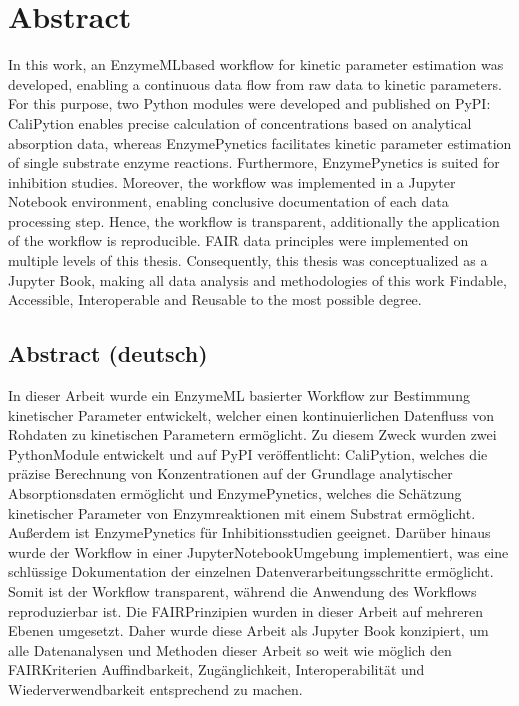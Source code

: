 \documentclass[letterpaper,12pt,english]{jupyterBook}
\begin{document}
\chapter{Abstract}
\label{\detokenize{abstract:abstract}}\label{\detokenize{abstract::doc}}
\sphinxAtStartPar
In this work, an EnzymeML\sphinxhyphen{}based workflow for kinetic parameter estimation was developed, enabling a continuous data flow from raw data to kinetic parameters.
For this purpose, two Python modules were developed and published on PyPI: CaliPytion enables precise calculation of concentrations based on analytical absorption data, whereas EnzymePynetics facilitates kinetic parameter estimation of single substrate enzyme reactions. Furthermore, EnzymePynetics is suited for inhibition studies.
Moreover, the workflow was implemented in a Jupyter Notebook environment, enabling conclusive documentation of each data processing step. Hence, the workflow is transparent, additionally the application of the workflow is reproducible. FAIR data principles were implemented on multiple levels of this thesis. Consequently, this thesis was conceptualized as a Jupyter Book, making all data analysis and methodologies of this work Findable, Accessible, Interoperable and Reusable to the most possible degree.


\section{Abstract (deutsch)}
\label{\detokenize{abstract:abstract-deutsch}}
\sphinxAtStartPar
In dieser Arbeit wurde ein EnzymeML basierter Workflow zur Bestimmung kinetischer Parameter entwickelt, welcher einen kontinuierlichen Datenfluss von Rohdaten zu kinetischen Parametern ermöglicht.
Zu diesem Zweck wurden zwei Python\sphinxhyphen{}Module entwickelt und auf PyPI veröffentlicht: CaliPytion, welches die präzise Berechnung von Konzentrationen auf der Grundlage analytischer Absorptionsdaten ermöglicht und EnzymePynetics, welches die Schätzung kinetischer Parameter von Enzymreaktionen mit einem Substrat ermöglicht. Außerdem ist EnzymePynetics für Inhibitionsstudien geeignet.
Darüber hinaus wurde der Workflow in einer Jupyter\sphinxhyphen{}Notebook\sphinxhyphen{}Umgebung implementiert, was eine schlüssige Dokumentation der einzelnen Datenverarbeitungsschritte ermöglicht. Somit ist der Workflow transparent, während die Anwendung des Workflows reproduzierbar ist. Die FAIR\sphinxhyphen{}Prinzipien wurden in dieser Arbeit auf mehreren Ebenen umgesetzt. Daher wurde diese Arbeit als Jupyter Book konzipiert, um alle Datenanalysen und Methoden dieser Arbeit so weit wie möglich den FAIR\sphinxhyphen{}Kriterien Auffindbarkeit, Zugänglichkeit, Interoperabilität und Wiederverwendbarkeit entsprechend zu machen.
\end{document}
